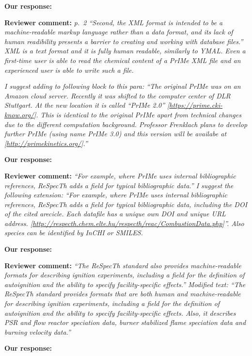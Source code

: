 \documentclass[a4paper,10pt]{elsarticle}
\begin{document}
\textbf{Our response:}



\textbf{Reviewer comment:}
\textit{p.~2 ``Second, the XML format is intended to be a machine-readable markup language rather than a data format, and its lack of human readibility presents a barrier to creating and working with database files.''
XML is a text format and it is fully human readable, similarly to YMAL. Even a first-time user is able to read the chemical content of a  PrIMe XML file and an experienced user is able to write such a file.}

\textit{I suggest adding to following block to this para: ``The original PrIMe was on an Amazon cloud server. Recently it was shifted to the computer center of DLR Stuttgart. At the new location it is called ``PrIMe 2.0'' [\url{https://prime.cki-know.org/}]. This is identical to the original PrIMe apart from technical changes due to the different computation background. Professor Frenklach plans to develop further PrIMe (using name PrIMe 3.0) and this version will be availabe at [\url{http://primekinetics.org/}].''
}

\textbf{Our response:}



\textbf{Reviewer comment:}
\textit{``For example, where PrIMe uses internal bibliographic references, ReSpecTh adds a field for typical bibliographic data.'' 
I suggest the following extension:
``For example, where PrIMe uses internal bibliographic references, ReSpecTh adds a field for typical bibliographic data, including the DOI of the cited arecicle. Each datafile has a unique own DOI and unique URL address. [\url{http://respecth.chem.elte.hu/respecth/reac/CombustionData.php}]''. Also species can be identified by InCHI or SMILES.
}

\textbf{Our response:}


\textbf{Reviewer comment:}
\textit{``The ReSpecTh standard also provides machine-readable formats for describing ignition experiments, including a field for the definition of autoignition and the ability to specify facility-specific effects.''
Modified text:
``The ReSpecTh standard provides formats that are both human and machine-readable for describing ignition experiments, including a field for the definition of autoignition and the ability to specify facility-specific effects. Also, it describes PSR and flow reactor speciation data, burner stabilized flame speciation data and burning velocity data.''
}

\textbf{Our response:}
\end{document}
